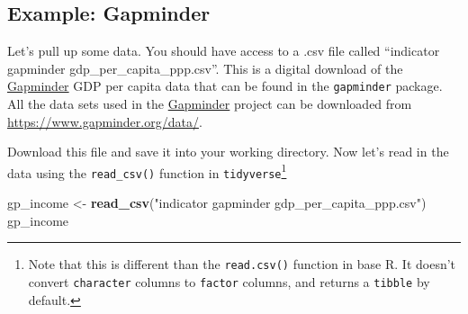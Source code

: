 \documentclass[]{book}
\newenvironment{Shaded}{\begin{snugshade}}{\end{snugshade}}
\newcommand{\KeywordTok}[1]{\textcolor[rgb]{0.13,0.29,0.53}{\textbf{{#1}}}}
\newcommand{\StringTok}[1]{\textcolor[rgb]{0.31,0.60,0.02}{{#1}}}
\newcommand{\NormalTok}[1]{{#1}}
\let\rmarkdownfootnote\footnote%
\def\footnote{\protect\rmarkdownfootnote}
\theoremstyle{definition}
\theoremstyle{definition}
\theoremstyle{definition}
\theoremstyle{remark}
\begin{document}
\subsection{Example: Gapminder}\label{example-gapminder}

Let's pull up some data. You should have access to a .csv file called
``indicator gapminder gdp\_per\_capita\_ppp.csv''. This is a digital
download of the \href{https://www.gapminder.org/}{Gapminder} GDP per
capita data that can be found in the \texttt{gapminder} package. All the
data sets used in the \href{https://www.gapminder.org/}{Gapminder}
project can be downloaded from \url{https://www.gapminder.org/data/}.

Download this file and save it into your working directory. Now let's
read in the data using the \texttt{read\_csv()} function in
\texttt{tidyverse}\footnote{Note that this is different than the
  \texttt{read.csv()} function in base R. It doesn't convert
  \texttt{character} columns to \texttt{factor} columns, and returns a
  \texttt{tibble} by default.}

\begin{Shaded}
\begin{Highlighting}[]
\NormalTok{gp_income <-}\StringTok{ }\KeywordTok{read_csv}\NormalTok{(}\StringTok{"indicator gapminder gdp_per_capita_ppp.csv"}\NormalTok{)}
\NormalTok{gp_income}
\end{Highlighting}
\end{Shaded}
\end{document}
